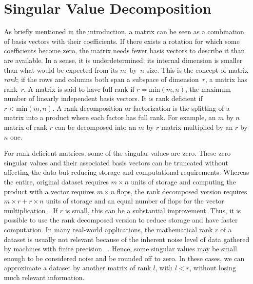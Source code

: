\documentclass[ijgi,article,submit,moreauthors,pdftex,10pt,a4paper]{Definitions/mdpi}
\begin{document}

\section{Singular Value Decomposition}
\label{sec:LinearAlgebra}

As briefly mentioned in the introduction, a matrix can be seen as a combination of basis vectors with their coefficients. If there exists a rotation for which some coefficients become zero, the matrix needs fewer basis vectors to describe it than are available. In a sense, it is underdetermined; its internal dimension is smaller than what would be expected from its $m$~by~$n$ size. This is the concept of matrix \textit{rank}; if the rows and columns both span a subspace of dimension~$r$, a matrix has rank~$r$. A matrix is said to have full rank if $r = \text{min}(m, n)$, the maximum number of linearly independent basis vectors. It is rank deficient if $r < \text{min}(m, n)$. A rank decomposition or factorization is the splitting of a matrix into a product where each factor has full rank. For example, an $m$ by $n$ matrix of rank $r$ can be decomposed into an $m$ by $r$ matrix multiplied by an $r$ by $n$ one. %

For rank deficient matrices, some of the singular values are zero. These zero singular values and their associated basis vectors can be truncated without affecting the data but reducing storage and computational requirements. Whereas the entire, original dataset requires $m \times n$ units of storage and computing the product with a vector requires $m \times n$ flops, the rank decomposed version requires $m \times r + r \times n$ units of storage and an equal number of flops for the vector multiplication~\cite{Martinsson2016}. If $r$ is small, this can be a substantial improvement. Thus, it is possible to use the rank decomposed version to reduce storage and have faster computation. In many real-world applications, the mathematical rank $r$ of a dataset is usually not relevant because of the inherent noise level of data gathered by machines with finite precision ~\cite{Martinsson2016}. Hence, some singular values may be small enough to be considered noise and be rounded off to zero. In these cases, we can approximate a dataset by another matrix of rank $l$, with $l < r$, without losing much relevant information.
\end{document}
